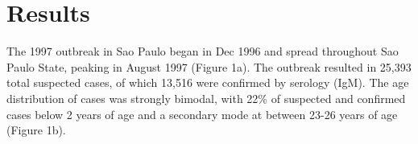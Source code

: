\section{\texorpdfstring{\textbf{Results}}{Results}}\label{results}

The 1997 outbreak in Sao Paulo began in Dec 1996 and spread throughout
Sao Paulo State, peaking in August 1997 (Figure 1a). The outbreak
resulted in 25,393 total suspected cases, of which 13,516 were confirmed
by serology (IgM). The age distribution of cases was strongly bimodal,
with 22\% of suspected and confirmed cases below 2 years of age and a
secondary mode at between 23-26 years of age (Figure 1b).
